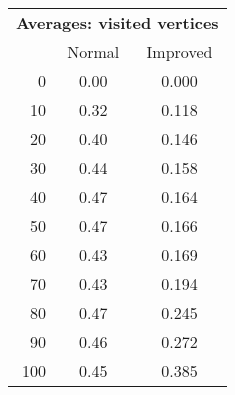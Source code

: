 \begin{tabular}{r|cc}
      \multicolumn{3}{c}{{\bf Averages: visited vertices }} \\
      & Normal & Improved \\ \hline\hline
0
& 0.00
& 0.000
\\
10
& 0.32
& 0.118
\\
20
& 0.40
& 0.146
\\
30
& 0.44
& 0.158
\\
40
& 0.47
& 0.164
\\
50
& 0.47
& 0.166
\\
60
& 0.43
& 0.169
\\
70
& 0.43
& 0.194
\\
80
& 0.47
& 0.245
\\
90
& 0.46
& 0.272
\\
100
& 0.45
& 0.385
\\
\end{tabular}

